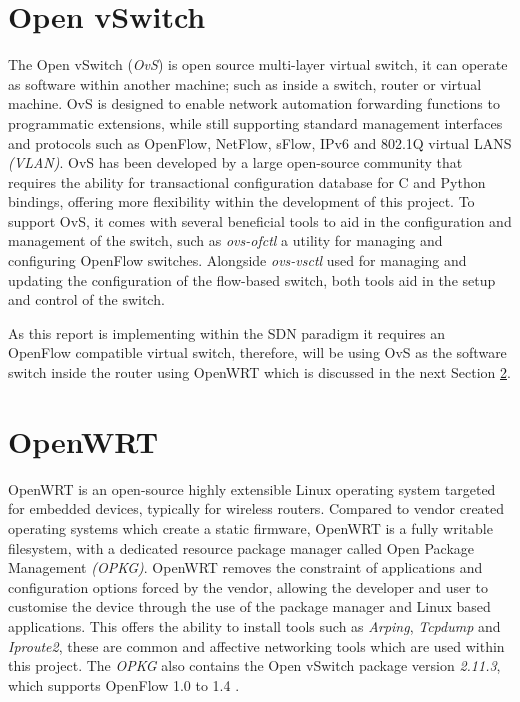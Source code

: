 \documentclass[12pt, oneside]{book}
\begin{document}

\section{Open vSwitch}
\label{sec:OvS}
The Open vSwitch (\emph{OvS}) is open source multi-layer virtual switch, it can operate as software within another machine;
such as inside a switch, router or virtual machine.
OvS is designed to enable network automation forwarding functions to programmatic extensions, while still supporting standard
management interfaces and protocols such as OpenFlow, NetFlow, sFlow, IPv6 and 802.1Q virtual LANS \emph{(VLAN)}.
OvS has been developed by a large open-source community that requires the ability for
transactional configuration database for C and Python bindings, offering more flexibility within the development of this project.
To support OvS, it comes with several beneficial tools to aid in the configuration and management of the switch,
such as \emph{ovs-ofctl} a utility for managing and configuring OpenFlow switches.
Alongside \emph{ovs-vsctl} used for managing and updating the configuration of the flow-based switch,
both tools aid in the setup and control of the switch\cite{openvswitch}.

As this report is implementing within the SDN paradigm it requires an OpenFlow compatible virtual switch, therefore, will be using
OvS as the software switch inside the router using OpenWRT which is discussed in the next Section \ref{sec:OpenWRT}.



\section{OpenWRT}
\label{sec:OpenWRT}
OpenWRT is an open-source highly extensible Linux operating system targeted for embedded devices, typically for wireless routers.
Compared to vendor created operating systems which create a static firmware,
OpenWRT is a fully writable filesystem, with a dedicated resource package manager
called Open Package Management \emph{(OPKG)}.
OpenWRT removes the constraint of applications and configuration options forced by the vendor,
allowing the developer and user to customise the device through the use of the package manager and Linux based applications.
This offers the ability to install tools such as \emph{Arping}, \emph{Tcpdump} and \emph{Iproute2}, these are common and
affective networking tools which are used within this project. The \emph{OPKG} also contains the Open vSwitch package version \emph{2.11.3},
which supports OpenFlow 1.0 to 1.4 \cite{openwrtproject}.
\end{document}

